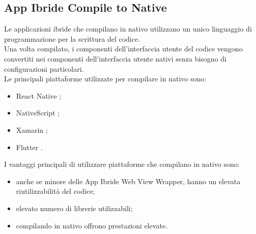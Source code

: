 \subsection{App Ibride Compile to Native}
Le applicazioni ibride che compilano in nativo \cite{apptonative} utilizzano un unico linguaggio di programmazione per la scrittura del codice.\\
 Una volta compilato, i componenti dell'interfaccia utente del codice vengono convertiti nei componenti dell'interfaccia utente nativi senza bisogno di configurazioni particolari.\\
Le principali piattaforme utilizzate per compilare in nativo sono:
\begin{itemize}
	\item React Native \cite{reactnative}; 
	\item NativeScript \cite{nativescript}; 
	\item Xamarin \cite{xamarin}; 
	\item Flutter \cite{flutter}.
\end{itemize}
I vantaggi principali di utilizzare piattaforme che compilano in nativo sono:
\begin{itemize}
	\item anche se minore delle App Ibride Web View Wrapper, hanno un elevata riutilizzabilità del codice; 
	\item elevato numero di librerie utilizzabili;  
	\item compilando in nativo offrono prestazioni elevate.
\end{itemize}
\newpage

